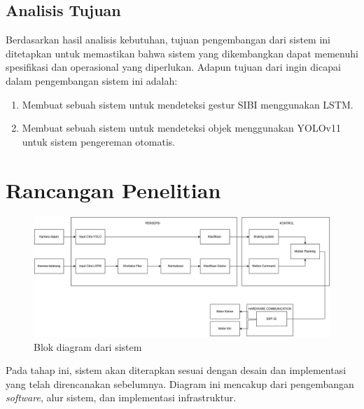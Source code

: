 \subsection{Analisis Tujuan}
Berdasarkan hasil analisis kebutuhan, tujuan pengembangan dari sistem ini ditetapkan untuk
memastikan bahwa sistem yang dikembangkan dapat memenuhi spesifikasi dan operasional
yang diperlukan. Adapun tujuan dari ingin dicapai dalam pengembangan sistem ini adalah:
\begin{enumerate}[nolistsep]
    \item Membuat sebuah sistem untuk mendeteksi gestur SIBI menggunakan LSTM.
    \item Membuat sebuah sistem untuk mendeteksi objek menggunakan YOLOv11 untuk sistem pengereman otomatis.
\end{enumerate}

\section{Rancangan Penelitian}
\begin{figure} [H] \centering
  \includegraphics[scale=0.4]{gambar/rancangan penelitian.jpg}
  \caption{Blok diagram dari sistem}
  \label{fig:rancangan penelitian}
\end{figure}
Pada tahap ini, sistem akan diterapkan sesuai dengan desain dan implementasi yang telah direncanakan sebelumnya. Diagram ini mencakup dari pengembangan\emph{ software}, alur sistem, dan implementasi infrastruktur. 
